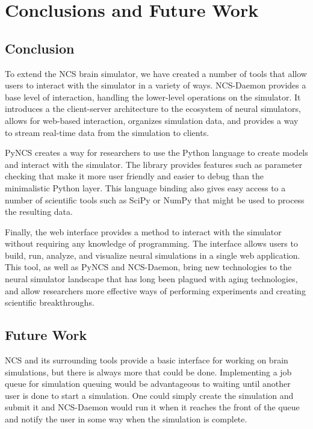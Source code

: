 \chapter{Conclusions and Future Work}
\label{chapter:conclusions}

\section{Conclusion}

To extend the NCS brain simulator, we have created a number of tools that allow users to interact with the simulator in a variety of ways. NCS-Daemon provides a base level of interaction, handling the lower-level operations on the simulator. It introduces a the client-server architecture to the ecosystem of neural simulators, allows for web-based interaction, organizes simulation data, and provides a way to stream real-time data from the simulation to clients. 

PyNCS creates a way for researchers to use the Python language to create models and interact with the simulator. The library provides features such as parameter checking that make it more user friendly and easier to debug than the minimalistic Python layer. This language binding also gives easy access to a number of scientific tools such as SciPy or NumPy that might be used to process the resulting data. 

Finally, the web interface provides a method to interact with the simulator without requiring any knowledge of programming. The interface allows users to build, run, analyze, and visualize neural simulations in a single web application. This tool, as well as PyNCS and NCS-Daemon, bring new technologies to the neural simulator landscape that has long been plagued with aging technologies, and allow researchers more effective ways of performing experiments and creating scientific breakthroughs.

\section{Future Work}

NCS and its surrounding tools provide a basic interface for working on brain simulations, but there is always more that could be done. Implementing a job queue for simulation queuing would be advantageous to waiting until another user is done to start a simulation. One could simply create the simulation and submit it and NCS-Daemon would run it when it reaches the front of the queue and notify the user in some way when the simulation is complete. 

